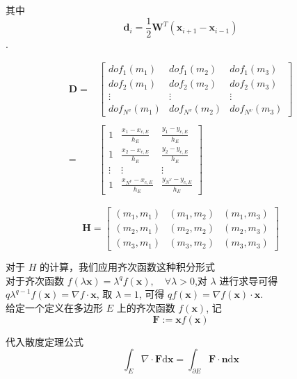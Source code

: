 其中 $$\mathbf d_{i} = \frac{1}{2}\mathbf W^T(\mathbf x_{i+1} - \mathbf x_{i-1})$$ .

\begin{equation*}
\begin{aligned}
\mathbf D = &\begin{bmatrix}
dof_1(m_1) & dof_1(m_2) &  dof_1(m_{3}) \\
dof_2(m_1) & dof_2(m_2) &  dof_2(m_{3}) \\
\vdots & \vdots & \vdots \\
dof_{N^{v}}(m_1) & dof_{N^{v}}(m_2) & dof_{N^{v}}(m_{3}) 
\end{bmatrix}\\
\\
= & \begin{bmatrix}
1 & \frac{x_1 - x_{c,E}}{h_E} &  \frac{y_1 - y_{c,E}}{h_E} \\
1 & \frac{x_2 - x_{c,E}}{h_E} &  \frac{y_2 - y_{c,E}}{h_E} \\
\vdots & \vdots & \vdots \\
1 & \frac{x_{N^V} - x_{c,E}}{h_E} & \frac{y_{N^V} - y_{c,E}}{h_E}
\end{bmatrix}
\end{aligned}
\end{equation*}

\begin{equation*}
\mathbf H = \begin{bmatrix}
(m_1, m_1) & (m_1, m_2) &  (m_1, m_{3}) \\
(m_2, m_1) & (m_2, m_2) &  (m_2, m_{3}) \\
(m_{3}, m_1) & (m_{3}, m_2) & (m_{3}, m_{3}) 
\end{bmatrix}
\end{equation*}

对于 $H$ 的计算，我们应用齐次函数这种积分形式 \\

对于齐次函数 $f(\lambda\mathbf x) = \lambda^qf(\mathbf x),\quad \forall \lambda > 0$,对 $\lambda$ 进行求导可得 $q\lambda^{q-1}f(\mathbf x) = \nabla f \cdot\mathbf{x}$, 取 $\lambda = 1$, 可得 $qf(\mathbf x) = \nabla f(\mathbf x)\cdot\mathbf x$. \\

给定一个定义在多边形 $E$ 上的齐次函数 $f(\mathbf{x})$, 记 \\
\begin{equation*}
\mathbf{F} := \mathbf{x}f(\mathbf{x})
\end{equation*}

代入散度定理公式\\
\begin{equation*}
\int_{E}\nabla\cdot\mathbf{F}\mathrm{d}\mathbf{x} = \int_{\partial E}\mathbf{F}\cdot\mathbf{n}\mathrm{d}\mathbf{x}
\end{equation*}

